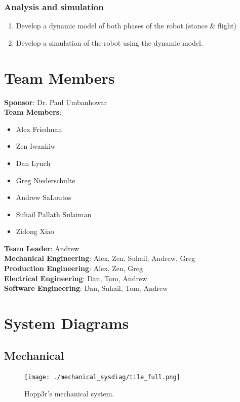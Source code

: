 \documentclass{report}
\begin{document}
\subsection{Analysis and simulation}
	\begin{enumerate}
		\item Develop a dynamic model of both phases of the robot (stance \& flight)
		\item Develop a simulation of the robot using the dynamic model.
	\end{enumerate}

\chapter[Team Members]{Team Members}

\textbf{Sponsor}: Dr. Paul Umbanhowar\\
\textbf{Team Members}:
\begin{itemize}
\item Alex Friedman
\item Zen Iwankiw
\item Dan Lynch
\item Greg Niederschulte
\item Andrew SaLoutos
\item Suhail Pallath Sulaiman
\item Zidong Xiao
\end{itemize}
\textbf{Team Leader}: Andrew\\
\textbf{Mechanical Engineering}: Alex, Zen, Suhail, Andrew, Greg\\
\textbf{Production Engineering}: Alex, Zen, Greg\\
\textbf{Electrical Engineering}: Dan, Tom, Andrew\\
\textbf{Software Engineering}: Dan, Suhail, Tom, Andrew

\chapter[System Diagrams]{System Diagrams}
\section[Mechanical]{Mechanical}
\begin{figure}[H]
	\centering
	\texttt{[image: ./mechanical\_sysdiag/tile\_full.png]}
	\caption{Hopp3r's mechanical system.}
	\label{fig:mech_system_diagram}
\end{figure}
\end{document}
